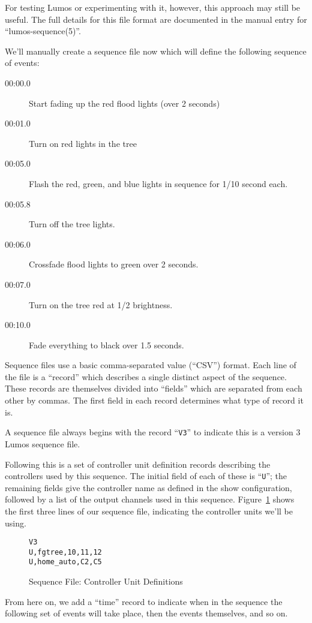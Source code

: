 \documentclass{article}
\begin{document}
For testing Lumos or experimenting with it, however, this approach may still
be useful.  The full details for this file format are documented in the manual
entry for ``lumos-sequence(5)''.

We'll manually create a sequence file now which will define the following
sequence of events:
\begin{description}
	\item[00:00.0]
		Start fading up the red flood lights (over 2 seconds)
	\item[00:01.0]
		Turn on red lights in the tree
	\item[00:05.0]
		Flash the red, green, and blue lights in sequence for 1/10 second
		each.
	\item[00:05.8]
		Turn off the tree lights.
	\item[00:06.0]
		Crossfade flood lights to green over 2 seconds.
	\item[00:07.0]
		Turn on the tree red at 1/2 brightness.
	\item[00:10.0]
		Fade everything to black over 1.5 seconds.
\end{description}

Sequence files use a basic comma-separated value (``CSV'') format.  Each 
line of the file is a ``record'' which describes a single distinct aspect
of the sequence.  These records are themselves divided into ``fields'' which
are separated from each other by commas.  The first field in each record
determines what type of record it is.

A sequence file always begins with the record ``{\tt V3}'' to indicate this is a
version 3 Lumos sequence file.  

Following this is a set of controller unit
definition records describing the controllers used by this sequence.  
The initial field of each of
these  is ``{\tt U}''; the remaining fields give the controller name as 
defined in the
show configuration, followed by a list of the output channels used in this
sequence.  Figure~\ref{seq:u}
shows the first three lines of our sequence file, indicating the controller
units we'll be using.

\begin{figure}[hbtp]
\begin{verbatim}
V3
U,fgtree,10,11,12
U,home_auto,C2,C5
\end{verbatim}
\caption{Sequence File: Controller Unit Definitions}
\label{seq:u}
\end{figure}

From here on, we add a ``time'' record to indicate when in the sequence
the following set of events will take place, then the events themselves, and
so on.  
\end{document}
